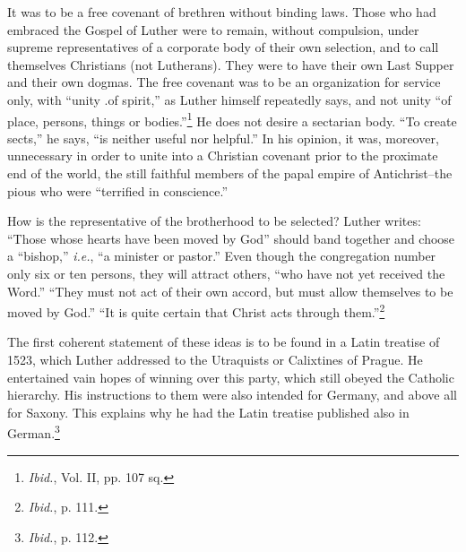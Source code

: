It was to be a free covenant of brethren without binding
laws. Those who had embraced the Gospel of Luther were to remain,
without compulsion, under supreme representatives of a corporate body of
their own selection, and to call themselves Christians (not Lutherans). They
were to have their own Last Supper and their own dogmas. The
free covenant was to be an
organization for service only, with “unity .of spirit,”
as Luther himself
repeatedly says, and not unity “of place, persons,
things or bodies.”\footnote{\textit{Ibid.}, Vol. II, pp. 107 sq.}
He does not desire a sectarian body. “To create sects,”
he says, “is neither useful nor helpful.” In his opinion, it was, moreover, unnecessary
in order to unite into a Christian covenant prior to the proximate end of the world, the still
faithful members of the papal empire of Antichrist--the pious who were
“terrified in conscience.”

How is the representative of the brotherhood to be selected? Luther
writes: “Those whose hearts have been moved by God” should band together
and choose a “bishop,” \textit{i.e.}, “a minister or pastor.” Even though the congregation
number only six or ten persons, they will attract others, “who
have not yet received the Word.” “They must not act of their own accord,
but must allow themselves to be moved by God.” “It is quite certain that
Christ acts through them.”\footnote{\textit{Ibid.}, p. 111.}

The first coherent statement of these ideas is to be found in a Latin
treatise of 1523, which Luther addressed to the Utraquists or Calixtines of
Prague. He entertained vain hopes of winning over this party, which still
obeyed the Catholic hierarchy. His instructions to them were also intended
for Germany, and above all for Saxony. This explains why he had the Latin
treatise published also in German.\footnote{\textit{Ibid.}, p. 112.}

